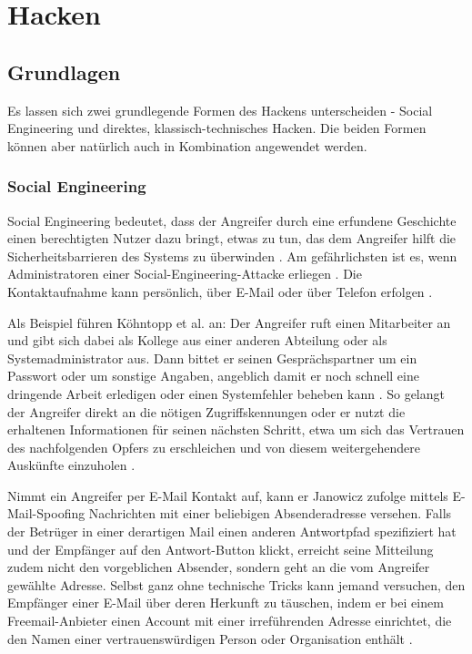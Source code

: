 \section{Hacken}
\subsection{Grundlagen}

Es lassen sich zwei grundlegende Formen des Hackens unterscheiden - Social Engineering und direktes, klassisch-technisches Hacken. Die beiden Formen können aber natürlich auch in Kombination angewendet werden.

\subsubsection{Social Engineering}

Social Engineering bedeutet, dass der Angreifer durch eine erfundene Geschichte einen berechtigten Nutzer dazu bringt, etwas zu tun, das dem Angreifer hilft die Sicherheitsbarrieren des Systems zu überwinden \cite[S.~77]{Pip00}. Am gefährlichsten ist es, wenn Administratoren einer Social-Engineering-Attacke erliegen \cite[S.~94]{Rae01}. Die Kontaktaufnahme kann persönlich, über E-Mail oder über Telefon erfolgen \cite[S.~119]{Sta95}.

Als Beispiel führen Köhntopp et al. an: Der Angreifer ruft einen Mitarbeiter an und gibt sich dabei als Kollege aus einer anderen Abteilung oder als Systemadministrator aus. Dann bittet er seinen Gesprächspartner um ein Passwort oder um sonstige Angaben, angeblich damit er noch schnell eine dringende Arbeit erledigen oder einen Systemfehler beheben kann \cite[S.~15]{KSG98}. So gelangt der Angreifer direkt an die nötigen Zugriffskennungen oder er nutzt die erhaltenen Informationen für seinen nächsten Schritt, etwa um sich das Vertrauen des nachfolgenden Opfers zu erschleichen und von diesem weitergehendere Auskünfte einzuholen \cite[S.~260]{ScB01}.

Nimmt ein Angreifer per E-Mail Kontakt auf, kann er Janowicz zufolge \zB{} mittels E-Mail-Spoofing Nachrichten mit einer beliebigen Absenderadresse versehen. Falls der Betrüger in einer derartigen Mail einen anderen Antwortpfad spezifiziert hat und der Empfänger auf den Antwort-Button klickt, erreicht seine Mitteilung zudem nicht den vorgeblichen Absender, sondern geht an die vom Angreifer gewählte Adresse. Selbst ganz ohne technische Tricks kann jemand versuchen, den Empfänger einer E-Mail über deren Herkunft zu täuschen, indem er bei einem Freemail-Anbieter einen Account mit einer irreführenden Adresse einrichtet, die den Namen einer vertrauenswürdigen Person oder Organisation enthält \cite[S.~109--110, 123]{Jan02}.

